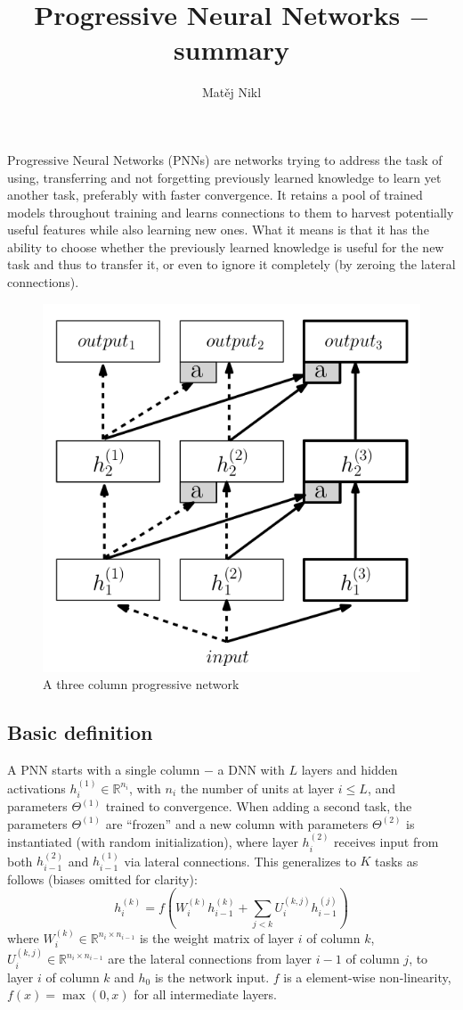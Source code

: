 \documentclass[a4paper,twocolumn]{article}
\title{Progressive Neural Networks $-$ summary}
\author{Matěj Nikl}
\begin{document}
\maketitle
\noindent
Progressive Neural Networks (PNNs) are networks trying to address the task of using, transferring and not forgetting previously learned knowledge to learn yet another task, preferably with faster convergence. It retains a pool of trained models throughout training and learns connections to them to harvest potentially useful features while also learning new ones. What it means is that it has the ability to choose whether the previously learned knowledge is useful for the new task and thus to transfer it, or even to ignore it completely (by zeroing the lateral connections).

    \begin{figure}[!h]
        \centering
        \includegraphics[width=0.75\columnwidth]{PNN.png}
        \caption{A three column progressive network}
    \end{figure}

\subsection*{Basic definition}
A PNN starts with a single column $-$ a DNN with $L$ layers and hidden activations $h_i^{(1)} \in \mathbb{R}^{n_i}$, with $n_i$ the number of units at layer $i \le L$, and parameters $\Theta^{(1)}$ trained to convergence. When adding a second task, the parameters $\Theta^{(1)}$ are ``frozen'' and a new column with parameters $\Theta^{(2)}$ is instantiated (with random initialization), where layer $h_i^{(2)}$ receives input from both $h_{i-1}^{(2)}$ and $h_{i-1}^{(1)}$ via lateral connections. This generalizes to $K$ tasks as follows (biases omitted for clarity):
\[
    h_i^{(k)} = f \left( W_i^{(k)}h_{i-1}^{(k)} + \sum_{j<k} U_i^{(k,j)} h_{i-1}^{(j)} \right)
\]
where $W_i^{(k)} \in \mathbb{R}^{n_i \times n_{i-1}}$ is the weight matrix of layer $i$ of column $k$, $U_i^{(k,j)} \in \mathbb{R}^{n_i \times n_{i-1}}$ are the lateral connections from layer $i-1$ of column $j$, to layer $i$ of column $k$ and $h_0$ is the network input. $f$ is a element-wise non-linearity, $f(x) = \max (0, x)$ for all intermediate layers.
\end{document}

